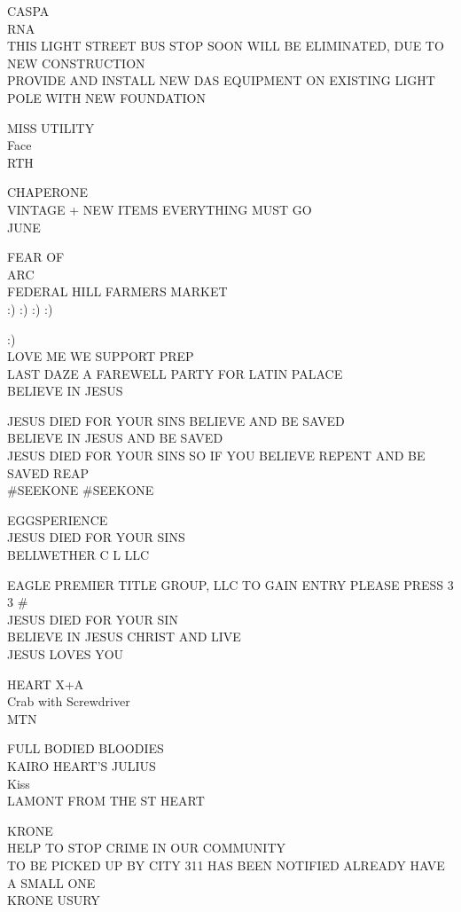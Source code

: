 \documentclass[10pt,letterpaper]{article}
\begin{document}
CASPA\\
RNA\\
THIS LIGHT STREET BUS STOP SOON WILL BE ELIMINATED, DUE TO NEW CONSTRUCTION\\
PROVIDE AND INSTALL NEW DAS EQUIPMENT ON EXISTING LIGHT POLE WITH NEW FOUNDATION

MISS UTILITY\\
Face\\
RTH

CHAPERONE\\
VINTAGE + NEW ITEMS EVERYTHING MUST GO\\
JUNE

FEAR OF\\
ARC\\
FEDERAL HILL FARMERS MARKET\\
:) :) :) :)

:)\\
LOVE ME WE SUPPORT PREP\\
LAST DAZE A FAREWELL PARTY FOR LATIN PALACE\\
BELIEVE IN JESUS

JESUS DIED FOR YOUR SINS BELIEVE AND BE SAVED\\
BELIEVE IN JESUS AND BE SAVED\\
JESUS DIED FOR YOUR SINS SO IF YOU BELIEVE REPENT AND BE SAVED REAP\\
\#SEEKONE \#SEEKONE

EGGSPERIENCE\\
JESUS DIED FOR YOUR SINS\\
BELLWETHER C L LLC

EAGLE PREMIER TITLE GROUP, LLC TO GAIN ENTRY PLEASE PRESS 3 3 \#\\
JESUS DIED FOR YOUR SIN\\
BELIEVE IN JESUS CHRIST AND LIVE\\
JESUS LOVES YOU

HEART X+A\\
Crab with Screwdriver\\
MTN

FULL BODIED BLOODIES\\
KAIRO HEART'S JULIUS\\
Kiss\\
LAMONT FROM THE ST HEART

KRONE\\
HELP TO STOP CRIME IN OUR COMMUNITY\\
TO BE PICKED UP BY CITY 311 HAS BEEN NOTIFIED ALREADY HAVE A SMALL ONE\\
KRONE USURY
\end{document}
